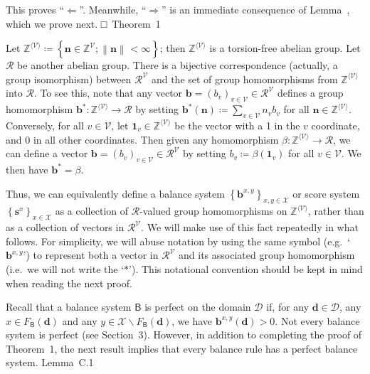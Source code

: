 \documentclass[
]{article}
\begin{document}
This proves ``\(\Longleftarrow\)''. Meanwhile, ``\(\Longrightarrow\)''
is an immediate consequence of Lemma~, which we prove next.
□~Theorem~1

Let
\(\mathbb{Z}^{\langle\mathcal{V}\rangle} ≔ \left\{ \mathbf{n} \in \mathbb{Z}^{\mathcal{V}};\left\| \mathbf{n} \right\|_{} < \infty \right\}\);
then \(\mathbb{Z}^{\langle\mathcal{V}\rangle}\) is a torsion-free
abelian group. Let \(\mathcal{R}\) be another abelian group. There is a
bijective correspondence (actually, a group isomorphism) between
\(\mathcal{R}^{\mathcal{V}}\) and the set of group homomorphisms from
\(\mathbb{Z}^{\langle\mathcal{V}\rangle}\) into \(\mathcal{R}\). To see
this, note that any vector
\(\mathbf{b} = \left( b_{v} \right)_{v \in \mathcal{V}} \in \mathcal{R}^{\mathcal{V}}\)
defines a group homomorphism
\(\left. \mathbf{b}^{\ast}:\mathbb{Z}^{\langle\mathcal{V}\rangle}\longrightarrow\mathcal{R} \right.\)
by setting
\(\mathbf{b}^{\ast}\left( \mathbf{n} \right) ≔ \sum_{v \in \mathcal{V}}n_{v}b_{v}\)
for all \(\mathbf{n} \in \mathbb{Z}^{\langle\mathcal{V}\rangle}\).
Conversely, for all \(v \in \mathcal{V}\), let
\(\mathbf{1}_{v} \in \mathbb{Z}^{\langle\mathcal{V}\rangle}\) be the
vector with a 1 in the \(v\) coordinate, and 0 in all other coordinates.
Then given any homomorphism
\(\left. \beta:\mathbb{Z}^{\langle\mathcal{V}\rangle}\longrightarrow\mathcal{R} \right.\),
we can define a vector
\(\mathbf{b} = \left( b_{v} \right)_{v \in \mathcal{V}} \in \mathcal{R}^{\mathcal{V}}\)
by setting \(b_{v} ≔ \beta\left( \mathbf{1}_{v} \right)\) for all
\(v \in \mathcal{V}\). We then have \(\mathbf{b}^{\ast} = \beta\).

Thus, we can equivalently define a balance system
\(\left\{ \mathbf{b}^{x,y} \right\}_{x,y \in \mathcal{X}}\) or score
system \(\left\{ \mathbf{s}^{x} \right\}_{x \in \mathcal{X}}\) as a
collection of \(\mathcal{R}\)-valued group homomorphisms on
\(\mathbb{Z}^{\langle\mathcal{V}\rangle}\), rather than as a collection
of vectors in \(\mathcal{R}^{\mathcal{V}}\). We will make use of this
fact repeatedly in what follows. For simplicity, we will abuse notation
by using the same symbol (e.g.~`\(\mathbf{b}^{x,y}\)') to represent both
a vector in \(\mathcal{R}^{\mathcal{V}}\) and its associated group
homomorphism (i.e.~we will not write the `\(\ast\)'). This notational
convention should be kept in mind when reading the next proof.

Recall that a balance system \(\mathsf{B}\) is perfect on the domain
\(\mathcal{D}\) if, for any \(\mathbf{d} \in \mathcal{D}\), any
\(x \in F_{\mathsf{B}}\left( \mathbf{d} \right)\) and any
\(y \in \mathcal{X} \smallsetminus F_{\mathsf{B}}\left( \mathbf{d} \right)\),
we have \(\mathbf{b}^{x,y}\left( \mathbf{d} \right) > 0\). Not every
balance system is perfect (see Section~3). However, in addition to
completing the proof of Theorem~1, the next result implies that every
balance rule has a perfect balance system. Lemma~C.1
\end{document}
